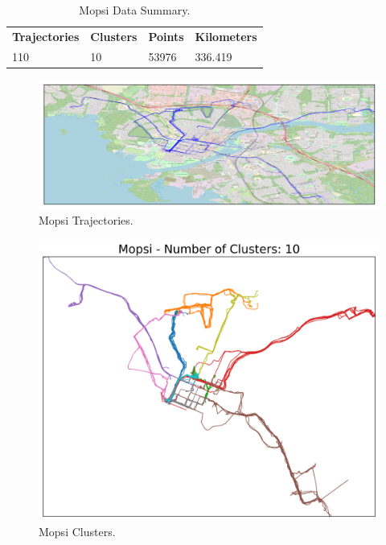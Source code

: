 \documentclass[a4paper, 12pt]{article}
\begin{document}
\begin{table}[bp!]
    \centering
    \def\arraystretch{2}%
    \caption{Mopsi Data Summary.}
    \begin{tabular}{|l|l|l|l|} 
     \hline
     \textbf{Trajectories} & \textbf{Clusters} & \textbf{Points} & \textbf{Kilometers} \\
     110 & 10 & 53976 & 336.419 \\
     \hline
    \end{tabular}
    \label{table:mopsi_summary}
\end{table}

\begin{figure}[htbp!]
    \centering
    \includegraphics[width=1\textwidth]{Mopsi Trajectories.png}
    \caption{Mopsi Trajectories.}
    \label{fig17}
\end{figure}

\begin{figure}[htbp!]
    \centering
    \includegraphics[width=1\textwidth]{Mopsi Clusters.png}
    \caption{Mopsi Clusters.}
    \label{fig18}
\end{figure}
\end{document}
